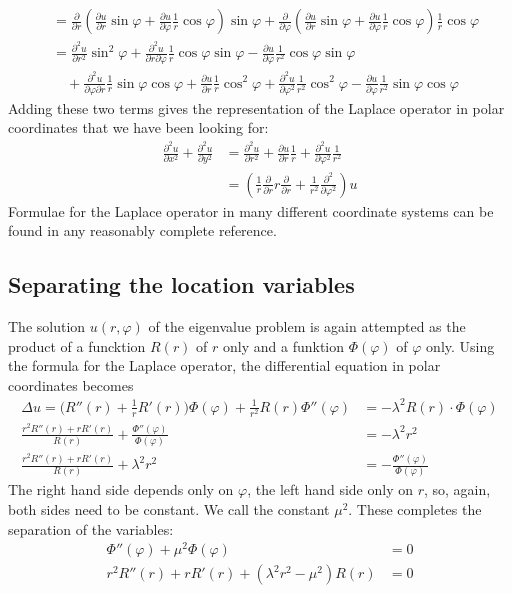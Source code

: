 \begin{align*}
&=
\frac{\partial}{\partial r}
\left(
\frac{\partial u}{\partial r}
\sin\varphi
+
\frac{\partial u}{\partial\varphi}
\frac1r\cos\varphi
\right)
\sin\varphi
+
\frac{\partial}{\partial \varphi}
\left(
\frac{\partial u}{\partial r}
\sin\varphi
+
\frac{\partial u}{\partial\varphi}
\frac1r\cos\varphi
\right)
\frac1r\cos\varphi
\\
&=
\frac{\partial^2u}{\partial r^2}\sin^2\varphi
+\frac{\partial^2u}{\partial r\partial\varphi}\frac1r\cos\varphi\sin\varphi
-\frac{\partial u}{\partial\varphi}\frac1{r^2}\cos\varphi\sin\varphi
\\
&\quad
+
\frac{\partial^2u}{\partial\varphi\partial r}\frac1r\sin\varphi\cos\varphi
+\frac{\partial u}{\partial r}\frac1r\cos^2\varphi
+\frac{\partial^2u}{\partial \varphi^2}\frac1{r^2}\cos^2\varphi
-\frac{\partial u}{\partial \varphi}\frac1{r^2}\sin\varphi\cos\varphi
\end{align*}
Adding these two terms gives the representation of the Laplace operator
in polar coordinates that we have been looking for:
\begin{align*}
\frac{\partial^2u}{\partial x^2}+\frac{\partial^2u}{\partial y^2}
&=
\frac{\partial^2u}{\partial r^2}
+\frac{\partial u}{\partial r}\frac1r
+\frac{\partial^2u}{\partial\varphi^2}\frac1{r^2}
\\
&=
\left(\frac1r\frac{\partial}{\partial r}r\frac{\partial}{\partial r}+\frac1{r^2}\frac{\partial^2}{\partial \varphi^2}\right)u
\end{align*}
Formulae for the Laplace operator in many different coordinate systems
can be found in any reasonably complete reference.

\subsection{Separating the location variables}
The solution $u(r,\varphi)$ of the eigenvalue problem is again attempted
as the product of a funcktion $R(r)$ of $r$ only and a funktion
$\Phi(\varphi)$ of $\varphi$ only.
Using the formula for the Laplace operator, the differential equation
in polar coordinates becomes
\begin{align*}
\Delta u=
\biggl(R''(r) + \frac1rR'(r)\biggr)\Phi(\varphi)
+\frac1{r^2}R(r)\Phi''(\varphi)&=-\lambda^2 R(r)\cdot\Phi(\varphi)\\
\frac{r^2R''(r)+rR'(r)}{R(r)}+\frac{\Phi''(\varphi)}{\Phi(\varphi)}
&=-\lambda^2 r^2
\\
\frac{r^2R''(r)+rR'(r)}{R(r)}+\lambda^2 r^2&=-\frac{\Phi''(\varphi)}{\Phi(\varphi)}
\end{align*}
The right hand side depends only on $\varphi$, the left hand side only on $r$,
so, again, both sides need to be constant.
We call the constant $\mu^2$.
These completes the separation of the variables:
\begin{align}
\Phi''(\varphi)+\mu^2\Phi(\varphi)&=0\label{phigleichung}\\
r^2R''(r)+rR'(r)+(\lambda^2 r^2-\mu^2)R(r)&=0\label{rgleichung}
\end{align}

